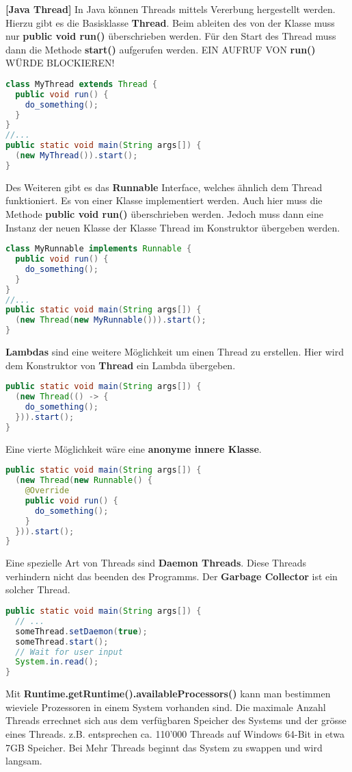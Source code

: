 \documentclass[8pt]{extarticle}
\let\oldtextbf\textbf
\renewcommand{\textbf}{\tiny\oldtextbf}
\begin{document}
\begin{multicols*}{5}
\textbf{[Java Thread]}
In Java können Threads mittels Vererbung hergestellt werden. Hierzu gibt es die Basisklasse \textbf{Thread}. Beim ableiten des von der Klasse muss nur \textbf{public void run()} überschrieben werden. Für den Start des Thread muss dann die Methode \textbf{start()} aufgerufen werden. EIN AUFRUF VON \textbf{run()} WÜRDE BLOCKIEREN!
\begin{lstlisting}[language=java]
class MyThread extends Thread {
  public void run() {
    do_something();
  }
}
//...
public static void main(String args[]) {
  (new MyThread()).start();
}
\end{lstlisting}
Des Weiteren gibt es das \textbf{Runnable} Interface, welches ähnlich dem Thread funktioniert. Es von einer Klasse implementiert werden. Auch hier muss die Methode \textbf{public void run()} überschrieben werden. Jedoch muss dann eine Instanz der neuen Klasse der Klasse Thread im Konstruktor übergeben werden.
\begin{lstlisting}[language=java]
class MyRunnable implements Runnable {
  public void run() {
    do_something();
  }
}
//...
public static void main(String args[]) {
  (new Thread(new MyRunnable())).start();
}
\end{lstlisting}
\textbf{Lambdas} sind eine weitere Möglichkeit um einen Thread zu erstellen. Hier wird dem Konstruktor von \textbf{Thread} ein Lambda übergeben.
\begin{lstlisting}[language=java]
public static void main(String args[]) {
  (new Thread(() -> {
    do_something();
  })).start();
}
\end{lstlisting}
Eine vierte Möglichkeit wäre eine \textbf{anonyme innere Klasse}.
\begin{lstlisting}[language=java]
public static void main(String args[]) {
  (new Thread(new Runnable() {
    @Override
    public void run() {
      do_something();
    }
  })).start();
}
\end{lstlisting}
Eine spezielle Art von Threads sind \textbf{Daemon Threads}. Diese Threads verhindern nicht das beenden des Programms. Der \textbf{Garbage Collector} ist ein solcher Thread.
\begin{lstlisting}[language=java]
public static void main(String args[]) {
  // ...
  someThread.setDaemon(true);
  someThread.start();
  // Wait for user input
  System.in.read();
}
\end{lstlisting}
Mit \textbf{Runtime.getRuntime().availableProcessors()} kann man bestimmen wieviele Prozessoren in einem System vorhanden sind. Die maximale Anzahl Threads errechnet sich aus dem verfügbaren Speicher des Systems und der grösse eines Threads. z.B. entsprechen ca. 110'000 Threads auf Windows 64-Bit in etwa 7GB Speicher. Bei Mehr Threads beginnt das System zu swappen und wird langsam.\\\\

\end{multicols*}
\end{document}
